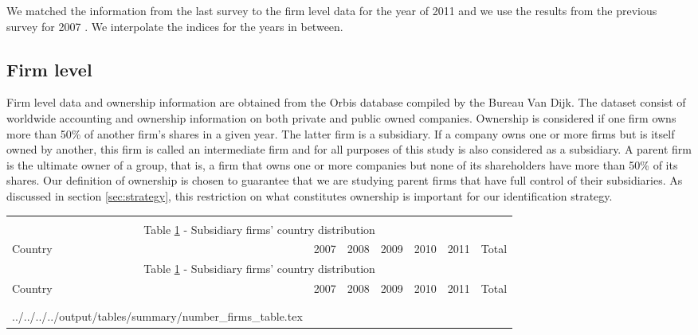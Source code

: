 \documentclass[12pt]{article}
\makeatletter
\newcommand\primitiveinput[1]
{\@@input #1 }
\makeatother
\begin{document}
	  We matched the information from the last survey to the firm level data for the year of 2011 and we use the results from the previous survey for 2007 \citep{barth2008bank}. We interpolate the indices for the years in between.  	   
	  	
 	\subsection{Firm level} \label{subsec:firm}
	Firm level data and ownership information are obtained from the Orbis database compiled by the Bureau Van Dijk. The dataset consist of worldwide accounting and ownership information on both private and public owned companies.  Ownership is considered if one firm owns more than 50\% of another firm's shares in a given year. The latter firm is a subsidiary. If a company owns one or more firms but is itself owned by another, this firm is called an intermediate firm and for all purposes of this study is also considered as a subsidiary. A parent firm is the ultimate owner of a group, that is, a firm that owns one or more companies but none of its shareholders have more than 50\% of its shares. Our definition of ownership is chosen to guarantee that we are studying parent firms that have full control of their subsidiaries. As discussed in section \ref{sec:strategy}, this restriction on what constitutes ownership is important for our identification strategy. 
	
	\begin{small}
		{
			\begin{longtable}{lrrrrrr}\\
				\label{tab:number of firms}\\
				\multicolumn{7}{c}{Table \ref{tab:number of firms} - Subsidiary firms' country distribution}\\
				\hline \hline \addlinespace Country & 2007 & 2008 & 2009 & 2010 & 2011 & Total  \\
				\endfirsthead
				\multicolumn{7}{c}{Table \ref{tab:number of firms} - Subsidiary firms' country distribution}\\
				\hline \hline \addlinespace Country & 2007 & 2008 & 2009 & 2010 & 2011 & Total  \\
				\hline \addlinespace \endhead
				\hline
				\multicolumn{7}{r}{{\textit{(Continued)}}}\\ \endfoot
				\\ 	
				\endlastfoot
				\primitiveinput{../../../../output/tables/summary/number_firms_table.tex}
				\hline 			
			\end{longtable}	
		}
	\end{small}
	
\end{document}
